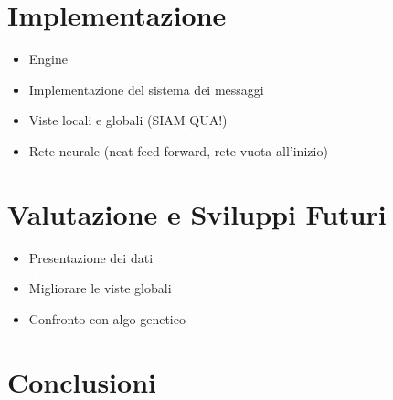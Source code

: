\documentclass[a4paper,10pt,abstracton]{scrartcl}
\begin{document}
\section{Implementazione}
\begin{itemize}
 \item Engine
 \item Implementazione del sistema dei messaggi
 \item Viste locali e globali (SIAM QUA!)
 \item Rete neurale (neat feed forward, rete vuota all'inizio)
\end{itemize}



\section{Valutazione e Sviluppi Futuri}
\begin{itemize}
 \item Presentazione dei dati
 \item Migliorare le viste globali
 \item Confronto con algo genetico
\end{itemize}



\section{Conclusioni}





\end{document}
